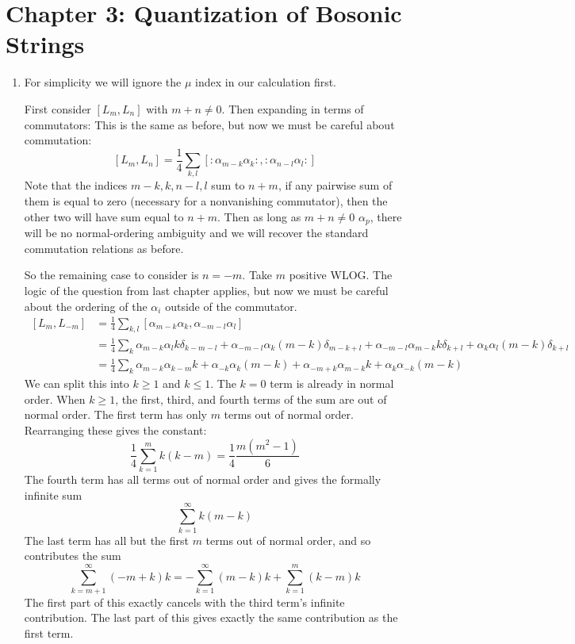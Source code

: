 \documentclass[11pt, class=article, crop=false]{standalone}
\begin{document}
	

	\section*{Chapter 3: Quantization of Bosonic Strings} %
	\label{sec:chapter_3_quantization_of_bosonic_strings}
	
	\begin{enumerate}
		\item 
		For simplicity we will ignore the $\mu$ index in our calculation first.
		
   		First consider $[L_m, L_n]$ with $m+n \neq 0$. Then expanding in terms of commutators: This is the same as before, but now we must be careful about commutation: 
   	 \[
   	 		[L_m, L_n ] = \frac14 \sum_{k, l} [:\alpha_{m-k} \alpha_k: , :\alpha_{n-l} \alpha_l: ] 
   	 \]
   	 Note that the indices $m-k, k, n-l, l$ sum to $n+m$, if any pairwise sum of them is equal to zero (necessary for a nonvanishing commutator), then the other two will have sum equal to $n+m$. Then as long as $m+n \neq 0$ $\alpha_p$, there will be no normal-ordering ambiguity and we will recover the standard commutation relations as before. 
	 
	 So the remaining case to consider is $n = -m$. Take $m$ positive WLOG. The logic of the question from last chapter applies, but now we must be careful about the ordering of the $\alpha_i$ outside of the commutator. 
	 \begin{equation}
	 	\begin{aligned}
	 		\, [L_m, L_{-m}] &= \frac14 \sum_{k, l} [\alpha_{m-k} \alpha_k, \alpha_{-m-l} \alpha_l]\\
			&= \frac14 \sum_k \alpha_{m-k} \alpha_l k \delta_{k-m-l} 
				+ \alpha_{-m-l} \alpha_k (m-k) \delta_{m-k+l} 
				+ \alpha_{-m-l} \alpha_{m-k} k \delta_{k+l}
				+ \alpha_k \alpha_l (m-k) \delta_{k+l}\\
			&= \frac14 \sum_k \alpha_{m-k} \alpha_{k-m} k
				+ \alpha_{-k} \alpha_k (m-k)
				+ \alpha_{-m+k} \alpha_{m-k} k
				+ \alpha_{k} \alpha_{-k} (m-k)
	 	\end{aligned}
	 \end{equation}
	 We can split this into $k \geq 1$ and $k \leq 1$. The $k = 0$ term is already in normal order. When $k \geq 1$, the first, third, and fourth terms of the sum are out of normal order. The first term has only $m$ terms out of normal order. Rearranging these gives the constant:
	 \begin{equation*}
	 	\frac14 \sum_{k=1}^m k (k-m) = \frac14 \frac{m (m^2 - 1)}{6}
	 \end{equation*}
	 The fourth term has all terms out of normal order and gives the formally infinite sum
	 \[
	 	\sum_{k=1}^\infty k(m-k)
	 \]
	 The last term has all but the first $m$ terms out of normal order, and so contributes the sum
	 \[
	 	\sum_{k=m+1}^\infty (-m + k) k = - \sum_{k=1}^\infty (m-k) k + \sum_{k=1}^m (k-m) k
	 \]
	 The first part of this exactly cancels with the third term's infinite contribution. The last part of this gives exactly the same contribution as the first term. 
	 

\end{enumerate}
\end{document}

